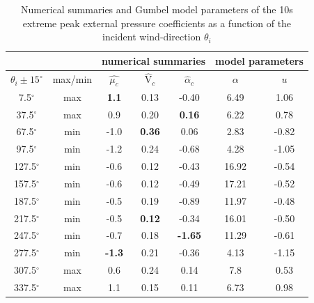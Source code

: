\begin{table}[H]                                                                                     
	\footnotesize
	\centering                                                                                            
	\caption{Numerical summaries and Gumbel model parameters of the 10s extreme peak external pressure coefficients as a function of the incident wind-direction $\theta_i$}
	\label{table:descriptive_statistics_C}                                                             
	\begin{tabular}{|c|c|c|c|c|c|c|}                                                                    
		\hline
		&               &\multicolumn{3}{|c|}{numerical summaries}  &\multicolumn{2}{|c|}{model parameters}             \\ \hline
		$\theta_i\pm15^{\circ}$	&	max/min	&	$\hat{\mu_c}$	&	$\hat{\text{V}}_c$ &	$\hat{\alpha}_c$	&	$\alpha$	&	$u$	\\	\hline
		7.5$^{\circ}$	&	max	&	\textbf{1.1}	&	0.13	&	-0.40	&	6.49	&	1.06	\\	\hline
		37.5$^{\circ}$	&	max	&	0.9	&	0.20	&	\textbf{0.16}	&	6.22	&	0.78	\\	\hline
		67.5$^{\circ}$	&	min	&	-1.0	&	\textbf{0.36}	&	0.06	&	2.83	&	-0.82	\\	\hline
		97.5$^{\circ}$	&	min	&	-1.2	&	0.24	&	-0.68	&	4.28	&	-1.05	\\	\hline
		127.5$^{\circ}$	&	min	&	-0.6	&	0.12	&	-0.43	&	16.92	&	-0.54	\\	\hline
		157.5$^{\circ}$	&	min	&	-0.6	&	0.12	&	-0.49	&	17.21	&	-0.52	\\	\hline
		187.5$^{\circ}$	&	min	&	-0.5	&	0.19	&	-0.89	&	11.97	&	-0.48	\\	\hline
		217.5$^{\circ}$	&	min	&	-0.5	&	\textbf{0.12}	&	-0.34	&	16.01	&	-0.50	\\	\hline
		247.5$^{\circ}$	&	min	&	-0.7	&	0.18	&	\textbf{-1.65}	&	11.29	&	-0.61	\\	\hline
		277.5$^{\circ}$	&	min	&	\textbf{-1.3}	&	0.21	&	-0.36	&	4.13	&	-1.15	\\	\hline
		307.5$^{\circ}$	&	max	&	0.6	&	0.24	&	0.14	&	7.8	&	0.53	\\	\hline
		337.5$^{\circ}$	&	max	&	1.1	&	0.15	&	0.11	&	6.73	&	0.98	\\	\hline
	\end{tabular}
\end{table}

